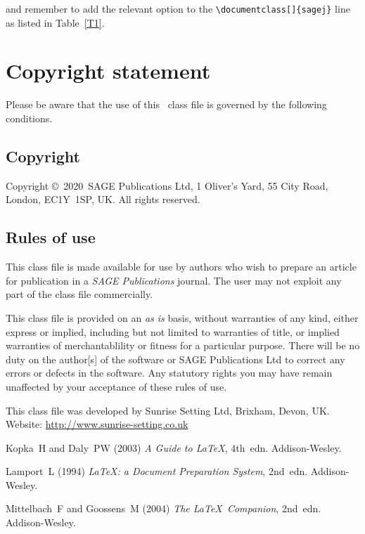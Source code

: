 \documentclass[Afour,sageh,times]{sagej}
\def\volumeyear{2020}
\begin{document}

%


and remember to add the relevant option to the \verb+\documentclass[]{sagej}+ line as listed in Table~\ref{T1}. 

%

\section{Copyright statement}
Please  be  aware that the use of  this \LaTeXe\ class file is
governed by the following conditions.

\subsection{Copyright}
Copyright \copyright\ \volumeyear\ SAGE Publications Ltd,
1 Oliver's Yard, 55 City Road, London, EC1Y~1SP, UK. All
rights reserved.

\subsection{Rules of use}
This class file is made available for use by authors who wish to
prepare an article for publication in a \textit{SAGE Publications} journal.
The user may not exploit any
part of the class file commercially.

This class file is provided on an \textit{as is}  basis, without
warranties of any kind, either express or implied, including but
not limited to warranties of title, or implied  warranties of
merchantablility or fitness for a particular purpose. There will
be no duty on the author[s] of the software or SAGE Publications Ltd
to correct any errors or defects in the software. Any
statutory  rights you may have remain unaffected by your
acceptance of these rules of use.

\begin{acks}
This class file was developed by Sunrise Setting Ltd,
Brixham, Devon, UK.\\
Website: \url{http://www.sunrise-setting.co.uk}
\end{acks}

\begin{thebibliography}{99}
Kopka~H and Daly~PW (2003) \textit{A Guide to \LaTeX}, 4th~edn.
Addison-Wesley.

Lamport~L (1994) \textit{\LaTeX: a Document Preparation System},
2nd~edn. Addison-Wesley.

Mittelbach~F and Goossens~M (2004) \textit{The \LaTeX\ Companion},
2nd~edn. Addison-Wesley.

\end{thebibliography}
\end{document}
